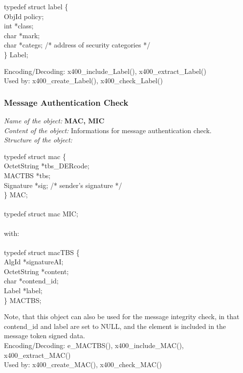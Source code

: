 {\small
\btab
\1 typedef struct label \{ \\
\2      ObjId \2  policy; \\
\2      int  \2        *class;  \\
\2      char \2        *mark;   \\
\2      char \2        *categs; /* address of security categories */ \\
\1 \} Label; \\
\etab
}

Encoding/Decoding: x400\_include\_Label(), x400\_extract\_Label() \\
Used by: x400\_create\_Label(), x400\_check\_Label()

\subsubsection{Message Authentication Check}
\label{x4_MAC}
{\em Name of the object:} {\bf MAC, MIC} \\
{\em Content of the object:} Informations for message authentication check. \\
{\em Structure of the object:}

{\small
\btab
\1 typedef struct mac \{ \\
\2      OctetString \2  *tbs\_DERcode; \\
\2      MACTBS    \2    *tbs; \\
\2      Signature \2    *sig; /* sender's signature */ \\
\1 \} MAC; \\ \\
\1 typedef struct mac MIC; \\ \\
with: \\ \\
\1 typedef struct macTBS \{  \\
\2     AlgId       \2   *signatureAI; \\
\2     OctetString \2   *content; \\
\2     char        \2   *contend\_id; \\
\2     Label       \2   *label; \\
\1 \} MACTBS; \\
\etab
}

Note, that this object can also be used for the message integrity check,
in that contend\_id and label are set to NULL,
and the element is included in the message token signed data.
\\
Encoding/Decoding: e\_MACTBS(), x400\_include\_MAC(), x400\_extract\_MAC() \\
Used by: x400\_create\_MAC(), x400\_check\_MAC()

